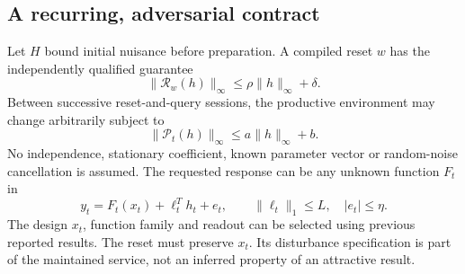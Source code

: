 \documentclass[11pt,letterpaper]{article}
\theoremstyle{definition}\newtheorem{definition}[theorem]{Definition}
\theoremstyle{remark}\newtheorem{remark}[theorem]{Remark}
\begin{document}
\subsection{A recurring, adversarial contract}
Let $H$ bound initial nuisance before preparation. A compiled reset $w$ has the independently qualified guarantee
\begin{equation}
 \|\mathcal R_w(h)\|_\infty\leq\rho\|h\|_\infty+\delta.
 \label{eq:resetbound}
\end{equation}
Between successive reset-and-query sessions, the productive environment may change arbitrarily subject to
\begin{equation}
 \|\mathcal P_t(h)\|_\infty\leq a\|h\|_\infty+b.
 \label{eq:between}
\end{equation}
No independence, stationary coefficient, known parameter vector or random-noise cancellation is assumed. The requested response can be any unknown function $F_t$ in
\begin{equation}
 y_t=F_t(x_t)+\ell_t^Th_t+e_t,
 \qquad \|\ell_t\|_1\leq L,\quad |e_t|\leq\eta.
 \label{eq:query}
\end{equation}
The design $x_t$, function family and readout can be selected using previous reported results. The reset must preserve $x_t$. Its disturbance specification is part of the maintained service, not an inferred property of an attractive result.
\end{document}
